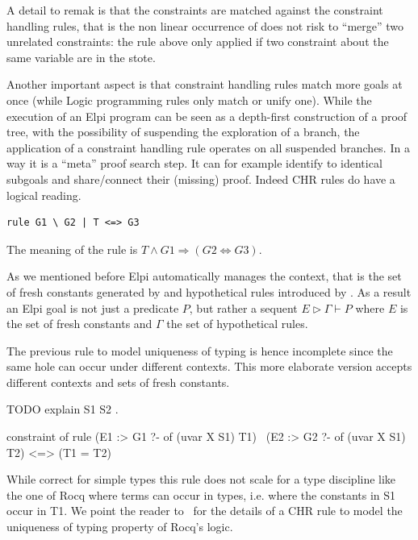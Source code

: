 \documentclass[a4paper, 11pt]{book}
\begin{document}
A detail to remak is that the constraints are matched against
the constraint handling rules, that is the non linear occurrence
of  does not risk to ``merge'' two unrelated constraints:
the rule above only applied if two constraint about the same variable
are in the stote.

Another important aspect is that constraint handling rules
match more goals at once (while Logic programming rules
only match or unify one). While the execution of an Elpi program
can be seen as a depth-first construction of a proof tree, with
the possibility of suspending the exploration of a branch, the
application of a constraint handling rule operates on all suspended
branches. In a way it is a ``meta'' proof search step. It can for
example identify to identical subgoals and share/connect their (missing)
proof. Indeed CHR rules do have a logical reading.

\begin{verbatim}
rule G1 \ G2 | T <=> G3
\end{verbatim}

The meaning of the rule is $T \land G1 \Rightarrow (G2 \Leftrightarrow G3)$.
  
As we mentioned before Elpi automatically manages the context, that is
the set of fresh constants generated by  and hypothetical
rules introduced by \elpi{=>}. As a result an Elpi goal is
not just a predicate $P$, but rather a sequent $E \triangleright  \Gamma \vdash P$
where $E$ is the set of fresh constants and $\Gamma$ the set of hypothetical rules.

The previous rule to model uniqueness of typing is hence incomplete
since the same hole can occur under different contexts. This more
elaborate version accepts different contexts and sets of fresh constants.

TODO explain S1 S2 \cite{Jojgov}.

\begin{elpicode}
constraint of {
  rule (E1 :> G1 ?- of (uvar X S1) T1) \ (E2 :> G2 ?- of (uvar X S1) T2)
    <=> (T1 = T2)
}
\end{elpicode}

While correct for simple types this rule does not scale for a type
discipline like the one of Rocq where terms can occur in types,
i.e. where the constants in S1 occur in T1.
We point the reader to~\cite{TASSI_2019} for the details of
a CHR rule to model the uniqueness of typing property
of Rocq's logic.


\end{document}
